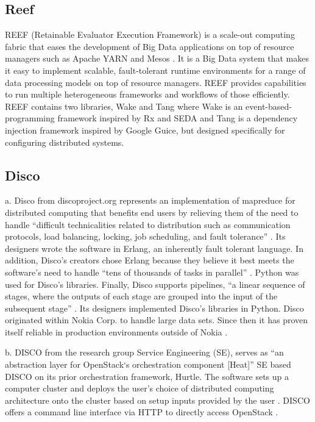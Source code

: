 \subsection{Reef}

     REEF (Retainable Evaluator Execution Framework)
     is a scale-out computing fabric that eases the development of Big
     Data applications on top of resource managers such as Apache YARN
     and Mesos \cite{www-reef}. It is a Big Data system that makes it easy to
     implement scalable, fault-tolerant runtime environments for a
     range of data processing models on top of resource managers. REEF
     provides capabilities to run multiple heterogeneous frameworks
     and workflows of those efficiently. REEF contains two libraries,
     Wake and Tang where Wake is an event-based-programming framework
     inspired by Rx and SEDA and Tang is a dependency injection
     framework inspired by Google Guice, but designed specifically for
     configuring distributed systems.

     \pv

     
\subsection{Disco}

     a. Disco from discoproject.org represents an implementation of
     mapreduce for distributed computing that benefits end users by
     relieving them of the need to handle ``difficult technicalities
     related to distribution such as communication protocols, load
     balancing, locking, job scheduling, and fault tolerance''
     \cite{www-whatis-discoproject}. Its designers wrote the software
     in Erlang, an inherently fault tolerant language. In addition,
     Disco’s creators chose Erlang because they believe it best meets
     the software’s need to handle ``tens of thousands of tasks in
     parallel'' \cite{www-erlangprime-discoproject}. Python was used
     for Disco’s libraries. Finally, Disco supports pipelines, ``a
     linear sequence of stages, where the outputs of each stage are
     grouped into the input of the subsequent stage''
     \cite{www-clarridge-discoproject}. Its designers implemented
     Disco’s libraries in Python. Disco originated within Nokia
     Corp. to handle large data sets.  Since then it has proven itself
     reliable in production environments outside of
     Nokia \cite{www-nokia-discoproject}.

     b. DISCO from the research group Service Engineering (SE),
     serves as ``an abstraction layer for OpenStack‘s orchestration
     component [Heat]''
     SE based DISCO on its prior orchestration framework, Hurtle. The
     software sets up a computer cluster and deploys the user’s choice
     of distributed computing architecture onto the cluster based on
     setup inputs provided
     by the user \cite{www-discoabout-discoabstractionlayer}.
     DISCO offers a command line interface via HTTP to directly access
     OpenStack \cite{www-discodescribed-discoabstractionlayer}.

